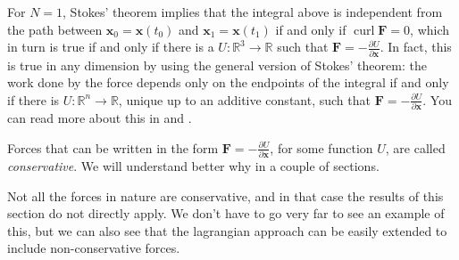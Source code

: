 \documentclass[english,fontsize=11pt,paper=a5,oneside]{scrbook}
\newcommand{\R}{\mathbb{R}}
\newcommand{\bx}{\bm{x}}
\DeclareMathOperator{\curl}{curl}
\theoremstyle{definition}
\newenvironment{remark}
  {\pushQED{\qed}\renewcommand{\qedsymbol}{$\lozenge$}\remarkx}
  {\popQED\endremarkx}
\begin{document}
\begin{remark}
For $N=1$, Stokes' theorem implies that the integral above is independent from the path between $\bx_0 = \bx(t_0)$ and $\bx_1 = \bx(t_1)$ if and only if $\curl \bm{F} = 0$, which in turn is true if and only if there is a $U:\R^3\to\R$ such that $\bm{F} = -\frac{\partial U}{\partial \bm{x}}$.
%
In fact, this is true in any dimension by using the general version of Stokes' theorem: the work done by the force depends only on the endpoints of the integral if and only if there is $U:\R^n\to\R$, unique up to an additive constant, such that $\bm{F} = -\frac{\partial U}{\partial \bm{x}}$.
%
You can read more about this in \cite[Chapter 2.5]{book:arnold} and \cite[Theorem 6.3 and 8.1]{book:knauf}.
\end{remark}

Forces that can be written in the form $\bm{F} = -\frac{\partial U}{\partial \bm{x}}$, for some function $U$, are called \emph{conservative}.
We will understand better why in a couple of sections.

Not all the forces in nature are conservative, and in that case the results of this section do not directly apply.
We don't have to go very far to see an example of this, but we can also see that the lagrangian approach can be easily extended to include non-conservative forces.
\end{document}

